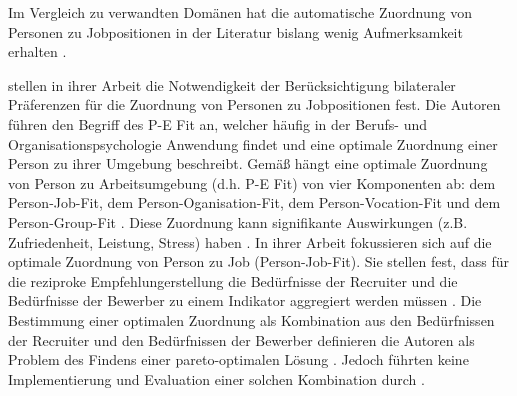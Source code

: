 Im Vergleich zu verwandten Domänen hat die automatische Zuordnung von Personen zu Jobpositionen in der Literatur bislang wenig Aufmerksamkeit erhalten \cite[S. 1469]{yildirim:article}.

\textcite[S. 1ff.]{malinowski:2006} stellen in ihrer Arbeit die Notwendigkeit der Berücksichtigung bilateraler Präferenzen für die Zuordnung von Personen zu Jobpositionen fest.
Die Autoren führen den Begriff des \ac{P-E Fit} an, welcher häufig in der Berufs- und Organisationspsychologie Anwendung findet \cite[S. 2]{link:booklet} und eine optimale Zuordnung einer Person zu ihrer Umgebung beschreibt.
Gemäß \textcite[S. 1ff.]{malinowski:2006} hängt eine optimale Zuordnung von Person zu Arbeitsumgebung (d.h. \ac{P-E Fit}) von vier Komponenten ab: dem Person-Job-Fit, dem Person-Oganisation-Fit, dem Per\-son-Vocation-Fit und dem Person-Group-Fit \cite[S. 3]{malinowski:2006}.
Diese Zuordnung kann signifikante Auswirkungen (z.B. Zufriedenheit, Leistung, Stress) haben \cite[S. 83]{su:2015}.
In ihrer Arbeit fokussieren sich \textcite[S. 4]{malinowski:2006} auf die optimale Zuordnung von Person zu Job (Person-Job-Fit).
Sie stellen fest, dass für die reziproke Empfehlungerstellung die Bedürfnisse der Recruiter und die Bedürfnisse der Bewerber zu einem Indikator \cite[S. 922]{siting:2012} aggregiert werden müssen \cite[S. 5]{malinowski:2006}.
Die Bestimmung einer optimalen Zuordnung als Kombination aus den Bedürfnissen der Recruiter und den Bedürfnissen der Bewerber definieren die Autoren als Problem des Findens einer pareto-optimalen Lösung \cite[S. 5]{malinowski:2006}.
Jedoch führten \textcite[S. 1ff.]{malinowski:2006} keine Implementierung und Evaluation einer solchen Kombination durch \cite[S. 549]{koprinska:inbook}.

